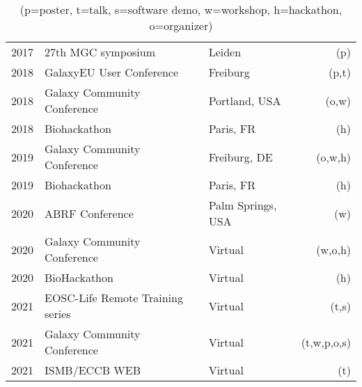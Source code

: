 \begin{table}[h!]
\begin{tabular}{llp{0.5cm}lr}
        2017 & 27th MGC symposium                          && Leiden          & (p) \\
        2018 & GalaxyEU User Conference                    && Freiburg        & (p,t) \\
        2018 & Galaxy Community Conference                 && Portland, USA   & (o,w) \\
        2018 & Biohackathon                                && Paris, FR       & (h) \\
        2019 & Galaxy Community Conference                 && Freiburg, DE    & (o,w,h) \\
        2019 & Biohackathon                                && Paris, FR       & (h) \\
        2020 & ABRF Conference                             && Palm Springs, USA & (w) \\
        2020 & Galaxy Community Conference                 && Virtual         & (w,o,h) \\
        2020 & BioHackathon                                && Virtual         & (h) \\
        2021 & EOSC-Life Remote Training series            && Virtual         & (t,s) \\
        2021 & Galaxy Community Conference                 && Virtual         & (t,w,p,o,s) \\
        2021 & ISMB/ECCB WEB                               && Virtual         & (t) \\

    \end{tabular}
    \caption*{(p=poster, t=talk, s=software demo, w=workshop, h=hackathon, o=organizer)}
\end{table}


